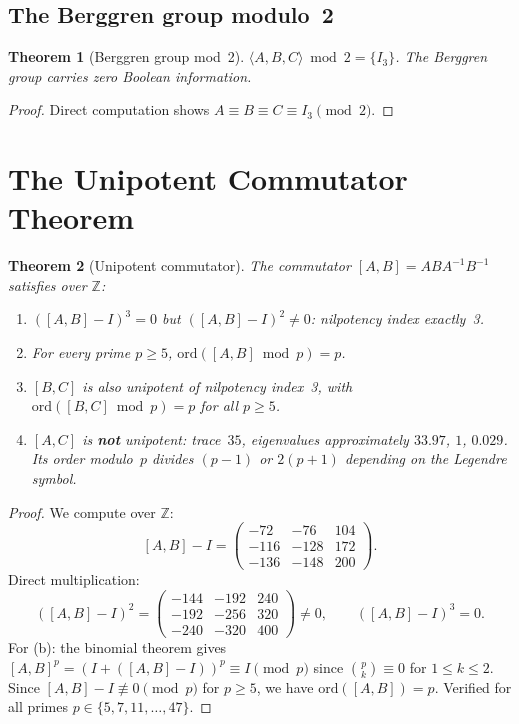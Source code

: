 \documentclass[12pt]{amsart}
\newtheorem{theorem}{Theorem}[section]
\theoremstyle{definition}
\theoremstyle{remark}
\begin{document}
\subsection{The Berggren group modulo~2}

\begin{theorem}[Berggren group mod~2]\label{thm:bg-mod2}
$\langle A,B,C\rangle \bmod 2 = \{I_3\}$. The Berggren group carries zero
Boolean information.
\end{theorem}

\begin{proof}
Direct computation shows $A \equiv B \equiv C \equiv I_3 \pmod{2}$.
\end{proof}


\section{The Unipotent Commutator Theorem}\label{sec:unipotent}

\begin{theorem}[Unipotent commutator]\label{thm:unipotent}
The commutator $[A,B] = ABA^{-1}B^{-1}$ satisfies over $\mathbb{Z}$:
\begin{enumerate}[label=(\alph*)]
  \item $([A,B] - I)^3 = 0$ but $([A,B] - I)^2 \neq 0$: nilpotency index
    exactly~3.
  \item For every prime $p \ge 5$, $\mathrm{ord}([A,B] \bmod p) = p$.
  \item $[B,C]$ is also unipotent of nilpotency index~3, with
    $\mathrm{ord}([B,C] \bmod p) = p$ for all $p \ge 5$.
  \item $[A,C]$ is \textbf{not} unipotent: trace~$35$, eigenvalues
    approximately $33.97$, $1$, $0.029$. Its order modulo~$p$ divides
    $(p-1)$ or $2(p+1)$ depending on the Legendre symbol.
\end{enumerate}
\end{theorem}

\begin{proof}
We compute over $\mathbb{Z}$:
\[
  [A,B] - I =
  \begin{pmatrix} -72 & -76 & 104 \\ -116 & -128 & 172 \\ -136 & -148 & 200 \end{pmatrix}.
\]
Direct multiplication:
\[
  ([A,B]-I)^2 =
  \begin{pmatrix} -144 & -192 & 240 \\ -192 & -256 & 320 \\ -240 & -320 & 400 \end{pmatrix}
  \neq 0,
  \qquad
  ([A,B]-I)^3 = 0.
\]
For (b): the binomial theorem gives
$[A,B]^p = (I + ([A,B]-I))^p \equiv I \pmod{p}$ since $\binom{p}{k} \equiv 0$
for $1 \le k \le 2$. Since $[A,B] - I \not\equiv 0 \pmod{p}$ for $p \ge 5$,
we have $\mathrm{ord}([A,B]) = p$. Verified for all primes
$p \in \{5,7,11,\ldots,47\}$.
\end{proof}
\end{document}

